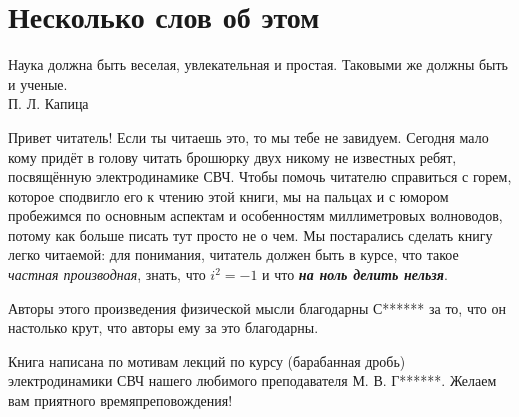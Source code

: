 \chapter*{Несколько слов об этом}

\begin{flushright}
{\scriptsize Наука должна быть веселая, увлекательная и простая. Таковыми же должны быть и ученые.\\
П. Л. Капица}
\end{flushright}

    Привет читатель! Если ты читаешь это, то мы тебе не завидуем. Сегодня мало
    кому придёт в голову читать брошюрку двух никому не известных ребят,
    посвящённую электродинамике СВЧ. Чтобы помочь читателю справиться с горем,
    которое сподвигло его к чтению этой книги, мы на пальцах и с юмором
    пробежимся по основным аспектам и особенностям миллиметровых волноводов,
    потому как больше писать тут просто не о чем. Мы постарались сделать книгу
    легко читаемой: для понимания, читатель должен быть в курсе, что такое
    \emph{частная производная}, знать, что \( i^2 = -1 \) и что
    \emph{\bfseries на ноль делить нельзя}.

    Авторы этого произведения физической мысли благодарны С****** за то, что он
    настолько крут, что авторы ему за это благодарны.

    Книга написана по мотивам лекций по курсу (барабанная дробь) электродинамики
    СВЧ нашего любимого преподавателя М. В. Г******. Желаем вам приятного
    времяпреповождения!


